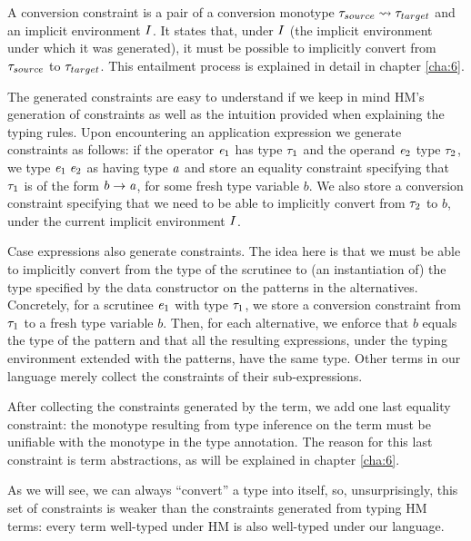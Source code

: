 A conversion constraint is a pair of a conversion monotype $\mathit{\tau}_{source} \rightsquigarrow \mathit{\tau}_{target}$ and an implicit environment $I$. It states that, under $I$ (the implicit environment under which it was generated), it must be possible to implicitly convert from $\mathit{\tau}_{source}$ to $\mathit{\tau}_{target}$. This entailment process is explained in detail in chapter \ref{cha:6}.

The generated constraints are easy to understand if we keep in mind HM's generation of constraints as well as the intuition provided when explaining the typing rules. Upon encountering an application expression we generate constraints as follows: if the operator $\mathit{e}_1$ has type $\mathit{\tau}_1$ and the operand $\mathit{e}_2$ type $\mathit{\tau}_2$, we type $\mathit{e}_1\;\mathit{e}_2$ as having type $\mathit{a}$ and store an equality constraint specifying that $\mathit{\tau}_1$ is of the form $b \to \mathit{a}$, for some fresh type variable $b$. We also store a conversion constraint specifying that we need to be able to implicitly convert from $\mathit{\tau}_2$ to $b$, under the current implicit environment $I$.

Case expressions also generate constraints. The idea here is that we must be able to implicitly convert from the type of the scrutinee to (an instantiation of) the type specified by the data constructor on the patterns in the alternatives. Concretely, for a scrutinee  $\mathit{e}_1$ with type $\mathit{\tau}_1$, we store a conversion constraint from $\mathit{\tau}_1$ to a fresh type variable $b$. Then, for each alternative, we enforce that $b$ equals the type of the pattern and that all the resulting expressions, under the typing environment extended with the patterns, have the same type. Other terms in our language merely collect the constraints of their sub-expressions.

After collecting the constraints generated by the term, we add one last equality constraint: the monotype resulting from type inference on the term must be unifiable with the monotype in the type annotation. The reason for this last constraint is term abstractions, as will be explained in chapter \ref{cha:6}.

As we will see, we can always ``convert'' a type into itself, so, unsurprisingly,  this set of constraints is weaker than the constraints generated from typing HM terms: every term well-typed under HM is also well-typed under our language.


